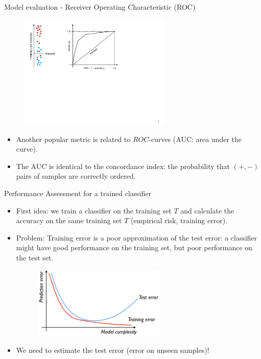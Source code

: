 \documentclass[xcolor=pdftex,dvipsnames,table]{beamer}
\begin{document}
\begin{frame}{Model evaluation - Receiver Operating Characteristic (ROC)}
	\begin{figure}[htb]
		\includegraphics[width=0.65\textwidth]{../graphics/ROC.pdf}
	\end{figure}
	\begin{itemize}
	\item Another popular metric is related to $ROC$-curves (AUC: area under the curve).
		\item The AUC is identical to the concordance index: the probability that $(+,-)$ pairs of samples are correctly ordered.
	\end{itemize}
\end{frame}



\begin{frame}{Performance Assessment for a trained classifier}
	\begin{itemize}
		\item<1-> First idea: we train a classifier on the training set $T$ and calculate the accuracy on the same training set $T$ (empirical risk, training error).
		\item<2-> Problem: Training error is a poor approximation of the test error: a classifier might have good performance on the training set, but poor performance on the test set.
		\begin{figure}[htb]
			\includegraphics[width=0.6\textwidth]{../graphics/Training_and_test_error.png}
		\end{figure}
		\item<3-> We need to estimate the test error (error on unseen samples)!
	\end{itemize}
\end{frame}
\end{document}
